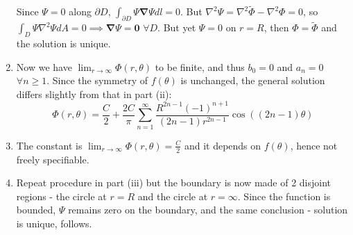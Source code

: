 \documentclass[a4paper]{article}
\begin{document}
\begin{ans}
\begin{enumerate}[label=(\roman*)]
Since $\Psi=0$ along $\partial D$, $\int_{\partial D}\Psi\boldsymbol{\nabla}\Psi dl=0$. But $\nabla^2\Psi=\nabla^2\tilde{\Phi}-\nabla^2\Phi=0$, so $\int_D\Psi\nabla^2\Psi dA=0\implies\boldsymbol{\nabla}\Psi=\boldsymbol{0}$ $\forall D$. But yet $\Psi=0$ on $r=R$, then $\Phi=\tilde{\Phi}$ and the solution is unique.
\item
Now we have $\lim_{r\rightarrow\infty}\Phi(r,\theta)$ to be finite, and thus $b_0=0$ and $a_n=0$ $\forall n\geq1$. Since the symmetry of $f(\theta)$ is unchanged, the general solution differs slightly from that in part (ii):
$$\Phi(r,\theta)=\frac{C}{2}+\frac{2C}{\pi}\sum_{n=1}^\infty\frac{R^{2n-1}(-1)^{n+1}}{(2n-1)r^{2n-1}}\cos((2n-1)\theta)$$
\item The constant is $\lim_{r\rightarrow\infty}\Phi(r,\theta)=\frac{C}{2}$ and it depends on $f(\theta)$, hence not freely specifiable.
\item Repeat procedure in part (iii) but the boundary is now made of 2 disjoint regions - the circle at $r=R$ and the circle at $r=\infty$. Since the function is bounded, $\Psi$ remains zero on the boundary, and the same conclusion - solution is unique, follows.
\end{enumerate}
\end{ans}
\newpage
\end{document}
